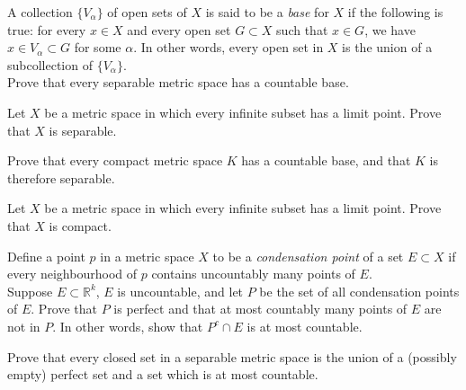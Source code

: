 \documentclass[12 pt, letterpaper]{hmcpset}
\begin{document}
\pagebreak

\begin{problem}[23.]
	A collection $\{ V_{\alpha} \}$ of open sets of $X$ is said to be a \textit{base} for $X$ if the following is true: for every $x \in X$ and every open set $G \subset X$ such that $x \in G$, we have $x \in V_{\alpha} \subset G$ for some $\alpha$. In other words, every open set in $X$ is the union of a subcollection of $\{ V_{\alpha} \}$. \\

	Prove that every separable metric space has a countable base.
\end{problem}

\pagebreak

\begin{problem}[24.]
	Let $X$ be a metric space in which every infinite subset has a limit point. Prove that $X$ is separable.
\end{problem}

\pagebreak

\begin{problem}[25.]
	Prove that every compact metric space $K$ has a countable base, and that $K$ is therefore separable.
\end{problem}

\pagebreak

\begin{problem}[26.]
	Let $X$ be a metric space in which every infinite subset has a limit point. Prove that $X$ is compact.
\end{problem}

\pagebreak

\begin{problem}[27.]
	Define a point $p$ in a metric space $X$ to be a \textit{condensation point} of a set $E \subset X$ if every neighbourhood of $p$ contains uncountably many points of $E$. \\

	Suppose $E \subset \mathbb{R}^{k}$, $E$ is uncountable, and let $P$ be the set of all condensation points of $E$. Prove that $P$ is perfect and that at most countably many points of $E$ are not in $P$. In other words, show that $P^{c} \cap E$ is at most countable.
\end{problem}

\pagebreak

\begin{problem}[28.]
	Prove that every closed set in a separable metric space is the union of a (possibly empty) perfect set and a set which is at most countable.
\end{problem}
\end{document}
